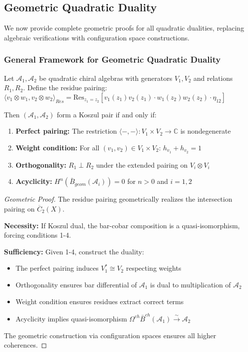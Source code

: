 \subsection{Geometric Quadratic Duality}
 
We now provide complete geometric proofs for all quadratic dualities, replacing algebraic verifications with configuration space constructions.
 
\subsubsection{General Framework for Geometric Quadratic Duality}

\begin{theorem}
Let $\mathcal{A}_1, \mathcal{A}_2$ be quadratic chiral algebras with generators $V_1, V_2$ and relations $R_1, R_2$.
Define the residue pairing:
$\langle v_1 \otimes w_1, v_2 \otimes w_2\rangle_{Res} = \text{Res}_{z_1=z_2}[v_1(z_1)v_2(z_1) \cdot w_1(z_2)w_2(z_2) \cdot \eta_{12}]$

Then $(\mathcal{A}_1, \mathcal{A}_2)$ form a Koszul pair if and only if:
\begin{enumerate}
\item \textbf{Perfect pairing:} The restriction $\langle-,-\rangle: V_1 \times V_2 \to \mathbb{C}$ is nondegenerate
\item \textbf{Weight condition:} For all $(v_1, v_2) \in V_1 \times V_2$: $h_{v_1} + h_{v_2} = 1$
\item \textbf{Orthogonality:} $R_1 \perp R_2$ under the extended pairing on $V_i \otimes V_i$
\item \textbf{Acyclicity:} $H^n(\bar{B}_{geom}(\mathcal{A}_i)) = 0$ for $n > 0$ and $i = 1,2$
\end{enumerate}
\end{theorem}

\begin{proof}[Geometric Proof]
The residue pairing geometrically realizes the intersection pairing on $\overline{C}_2(X)$.

\textbf{Necessity:} If Koszul dual, the bar-cobar composition is a quasi-isomorphism, forcing conditions 1-4.

\textbf{Sufficiency:} Given 1-4, construct the duality:
\begin{itemize}
\item The perfect pairing induces $V_1^* \cong V_2$ respecting weights
\item Orthogonality ensures bar differential of $\mathcal{A}_1$ is dual to multiplication of $\mathcal{A}_2$
\item Weight condition ensures residues extract correct terms
\item Acyclicity implies quasi-isomorphism $\Omega^{ch}\bar{B}^{ch}(\mathcal{A}_1) \xrightarrow{\sim} \mathcal{A}_2$
\end{itemize}

The geometric construction via configuration spaces ensures all higher coherences.
\end{proof}


